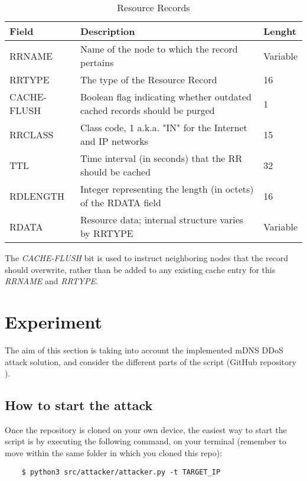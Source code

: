 \documentclass[fleqn, 10pt]{SelfArx} %
\begin{document}
\begin{table}[hbt]
	\centering
	\begin{tabular}{|C{1.7cm}|C{4.2cm}|C{1cm}|}
		\hline
		Field & Description & Lenght \\
		\hline
		\hline
		RRNAME & Name of the node to which the record pertains & Variable\\
		\hline
		RRTYPE & The type of the Resource Record & 16\\
		\hline
		CACHE-FLUSH & Boolean flag indicating whether outdated cached records should be purged & 1\\
		\hline
		RRCLASS & Class code, 1 a.k.a. "IN" for the Internet and IP networks & 15\\
		\hline
		TTL & Time interval (in seconds) that the RR should be cached & 32\\
		\hline
		RDLENGTH & Integer representing the length (in octets) of the RDATA field & 16\\
		\hline
		RDATA & Resource data; internal structure varies by RRTYPE & Variable\\
		\hline
	\end{tabular}
	\label{tab:table_2}
	\caption{Resource Records}
\end{table}

The {\it{CACHE-FLUSH}} bit is used to instruct neighboring nodes that the record should overwrite, rather than be added to any existing cache entry for this {\it{RRNAME}} and {\it{RRTYPE}}.


\section{Experiment}
The aim of this section is taking into account the implemented mDNS DDoS attack solution, and consider the different parts of the script
(GitHub repository \cite{repo}).

\subsection{How to start the attack}
Once the repository is cloned on your own device, the easiest way to start the script is by executing the following command, on your terminal (remember to move within the same folder
in which you cloned this repo):

\begin{footnotesize}
	\begin{verbatim}
	$ python3 src/attacker/attacker.py -t TARGET_IP 
	\end{verbatim}
\end{footnotesize}
\end{document}
